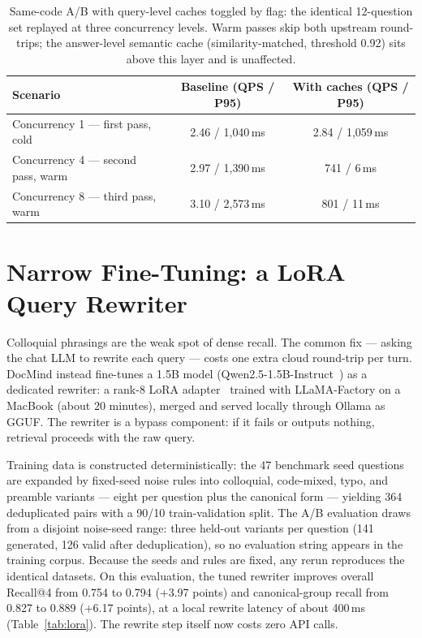 \documentclass[11pt,a4paper]{article}
\begin{document}
\begin{table}[t]
  \centering
  \caption{Same-code A/B with query-level caches toggled by flag: the identical
  12-question set replayed at three concurrency levels. Warm passes skip both upstream
  round-trips; the answer-level semantic cache (similarity-matched, threshold 0.92)
  sits above this layer and is unaffected.}
  \label{tab:cache}
  \begin{tabular}{lcc}
    \toprule
    Scenario & Baseline (QPS / P95) & With caches (QPS / P95) \\
    \midrule
    Concurrency 1 --- first pass, cold  & 2.46 / 1{,}040\,ms & 2.84 / 1{,}059\,ms \\
    Concurrency 4 --- second pass, warm & 2.97 / 1{,}390\,ms & 741 / 6\,ms        \\
    Concurrency 8 --- third pass, warm  & 3.10 / 2{,}573\,ms & 801 / 11\,ms       \\
    \bottomrule
  \end{tabular}
\end{table}

\section{Narrow Fine-Tuning: a LoRA Query Rewriter}\label{sec:lora}

Colloquial phrasings are the weak spot of dense recall. The common fix --- asking the
chat LLM to rewrite each query --- costs one extra cloud round-trip per turn. DocMind
instead fine-tunes a 1.5B model (Qwen2.5-1.5B-Instruct~\citep{qwen25}) as a dedicated
rewriter: a rank-8 LoRA adapter~\citep{hu2022lora} trained with LLaMA-Factory on a
MacBook (about 20 minutes), merged and served locally through Ollama as GGUF. The
rewriter is a bypass component: if it fails or outputs nothing, retrieval proceeds with
the raw query.

Training data is constructed deterministically: the 47 benchmark seed questions are
expanded by fixed-seed noise rules into colloquial, code-mixed, typo, and preamble
variants --- eight per question plus the canonical form --- yielding 364 deduplicated
pairs with a 90/10 train-validation split. The A/B evaluation draws from a disjoint
noise-seed range: three held-out variants per question (141 generated, 126 valid after
deduplication), so no evaluation string appears in the training corpus. Because the
seeds and rules are fixed, any rerun reproduces the identical datasets. On this
evaluation, the tuned rewriter improves overall Recall@4 from 0.754 to 0.794 (+3.97
points) and canonical-group recall from 0.827 to 0.889 (+6.17 points), at a local
rewrite latency of about 400\,ms (Table~\ref{tab:lora}). The rewrite step itself now
costs zero API calls.
\end{document}
